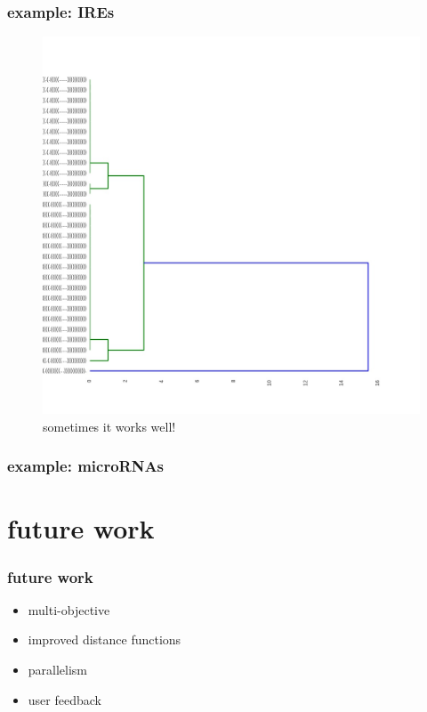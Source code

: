 \documentclass{beamer}
\begin{document}
\begin{frame}
	\frametitle{example: IREs}
	\begin{figure}
	\centering
	\includegraphics[scale=0.15]{figs/ires}
	\caption{sometimes it works well!}
	\end{figure}
	
\end{frame}



\begin{frame}
	\frametitle{example: microRNAs}
	
\end{frame}


\section{future work}
\begin{frame}
	\frametitle{future work}
	\begin{itemize}
		\item multi-objective
		\item improved distance functions
		\item parallelism
		\item user feedback
	\end{itemize}
\end{frame}
\end{document}
